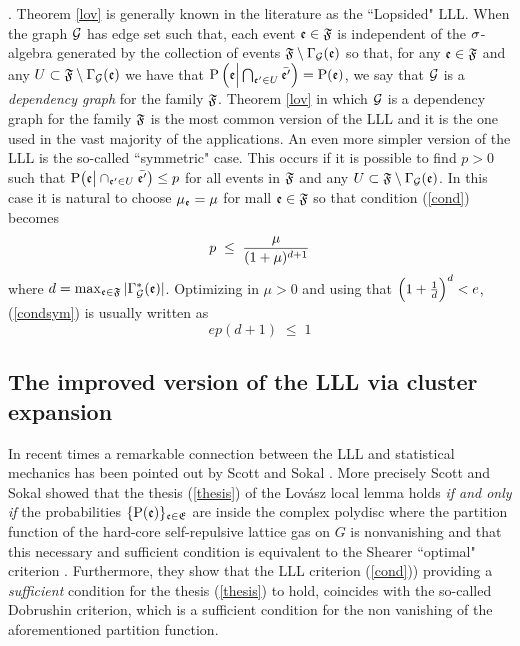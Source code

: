 \documentclass[11pt]{article}
\let\m=\mu \let\n=\nu \let\o=\omega    \let\p=\pi \let\ph=\varphi
\let\\=\noindent
\def\be{\begin{equation}}
\begin{document}
\\{\bf Remark}. Theorem \ref{lov} is generally known in the literature as the ``Lopsided" LLL.
When the  graph ${\cal G}$ has  edge set
such that,
each event ${\mathfrak{e}}\in {\mathfrak{F}}$   is independent of
the $\sigma$-algebra generated by the collection of events ${\mathfrak{F}} \setminus \Gamma_{\cal G}({\mathfrak{e}})$ so that, for any   ${\mathfrak{e}}\in {\mathfrak{F}}$ and any  ${U}\subset {\mathfrak{F}}\setminus \Gamma_{\cal G}({\mathfrak{e}})$
we have that ${\rm P}\left({\mathfrak{e}}\Big|\bigcap_{{\mathfrak{e}}'\in U}\bar{{\mathfrak{e}}'}\right)= {\rm P}({\mathfrak{e}})$, we say that ${\cal G}$ is a {\it dependency graph} for the family ${\mathfrak{F}}$. Theorem \ref{lov} in which ${\cal G}$ is a dependency graph for the family ${\mathfrak{F}}$ is the most common version of the LLL and it is the one used
in the vast majority of the applications. An even more simpler version of the LLL is the so-called ``symmetric" case.
This occurs if it is possible to find  $p>0$ such that  ${\rm P}\big({\mathfrak{e}}\big|\cap_{{\mathfrak{e}}'\in U}\bar{{\mathfrak{e}}'}\big)\le p$ for all events in ${\mathfrak{F}}$
and any  ${U}\subset {\mathfrak{F}}\setminus \Gamma_{\cal G}({\mathfrak{e}})$. In this case it is natural to choose $\m_\ev=\mu$ for mall ${\mathfrak{e}}\in {\mathfrak{F}}$ so that condition (\ref{cond}) becomes
\begin{equation}
\label{condsym}
p\;\leq\; {\mu \over (1+\m)^{d+1}}
\end{equation}
where $d=\max_{{\mathfrak{e}}\in {\mathfrak{F}}} |\Gamma^*_{\cal G}({\mathfrak{e}})|$.  Optimizing in $\mu>0$ and using that $\Big(1+{1\over d}\Big)^d<e$, (\ref{condsym}) is usually written
as
\be
\label{condsym2}
ep(d+1)\;\leq\; 1
\end{equation}




\subsection{The improved version of the LLL via cluster expansion}
In recent times a remarkable  connection between the LLL and statistical mechanics  has been
pointed out by Scott and Sokal \cite{SS}.
More precisely Scott and Sokal showed that the thesis (\ref{thesis})
of the Lov\'asz local lemma holds  {\it if and only if}
the probabilities $\{{\rm P}({\mathfrak{e}})\}_{{\mathfrak{e}}\in \mathfrak{E}}$
are inside the complex polydisc where the partition function
of the hard-core self-repulsive lattice gas on
$G$ is nonvanishing and that this necessary and sufficient condition is equivalent to the Shearer ``optimal"
criterion \cite{Sh}. Furthermore, they show that the
LLL criterion (\ref{cond})) providing a {\it sufficient} condition for  the thesis  (\ref{thesis}) to hold,
coincides  with  the so-called Dobrushin criterion, which is a sufficient condition for the non vanishing
of the aforementioned partition function.
\end{document}
